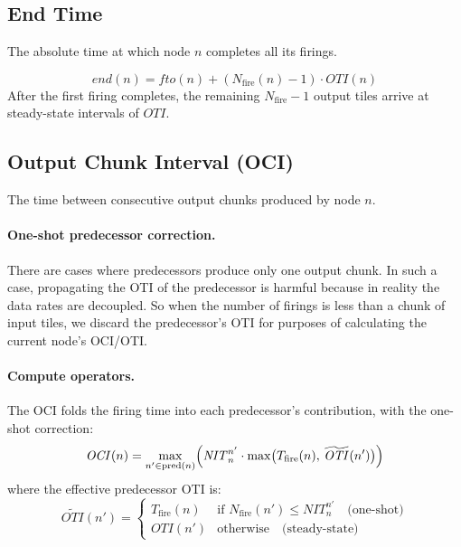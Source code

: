 \documentclass[10pt]{article}
\begin{document}
\subsection{End Time}

The absolute time at which node $n$ completes all its firings.

\begin{equation}
    \textit{end}(n) = \mathit{fto}(n) + \left(N_{\text{fire}}(n) - 1\right) \cdot \mathit{OTI}(n)
\end{equation}
After the first firing completes, the remaining $N_{\text{fire}} - 1$ output tiles arrive at steady-state intervals of $\mathit{OTI}$.

\subsection{Output Chunk Interval (OCI)}

The time between consecutive output chunks produced by node $n$.

\paragraph{One-shot predecessor correction.}
There are cases where predecessors produce only one output chunk. In such a case, propagating the OTI of the predecessor is harmful because in reality the data rates are decoupled. So when the number of firings is less than a chunk of input tiles, we discard the predecessor's OTI for purposes of calculating the current node's OCI/OTI.

\paragraph{Compute operators.} The OCI folds the firing time into each predecessor's contribution, with the one-shot correction:
\begin{equation}
    \mathit{OCI}(n) = \max_{n' \in \text{pred}(n)} \Bigl(\mathit{NIT}^{n'}_n \cdot \max\bigl(T_{\text{fire}}(n),\, \widetilde{\mathit{OTI}}(n')\bigr)\Bigr)
    \label{eq:oci-compute}
\end{equation}
where the effective predecessor OTI is:
\begin{equation}
    \widetilde{\mathit{OTI}}(n') = \begin{cases}
        T_{\text{fire}}(n) & \text{if } N_{\text{fire}}(n') \leq \mathit{NIT}^{n'}_n \quad \text{(one-shot)} \\
        \mathit{OTI}(n') & \text{otherwise} \quad \text{(steady-state)}
    \end{cases}
\end{equation}
\end{document}
